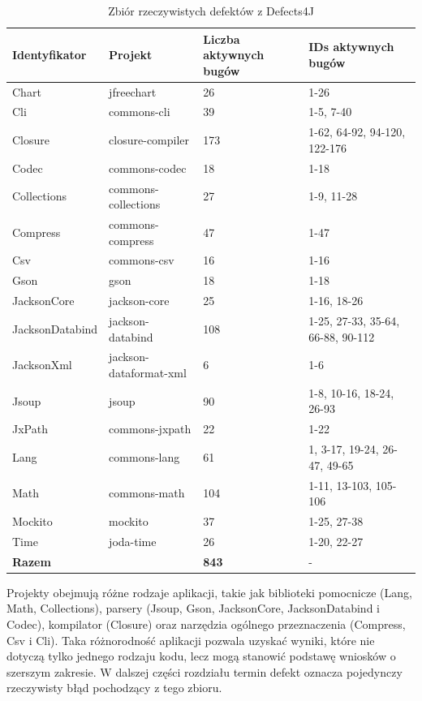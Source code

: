 \documentclass[12pt,a4paper,oldfontcommands]{memoir}
\theoremstyle{plain}
\theoremstyle{definition}
\theoremstyle{remark}
\begin{document}
    \begin{table}[H]
        \centering
        \small
        \begin{tabular}{|l|l|p{3.0cm}|l|}
            \hline
            Identyfikator & Projekt & Liczba aktywnych bugów & IDs aktywnych bugów \\ \hline
            Chart & jfreechart & 26 & 1-26 \\ \hline
            Cli & commons-cli & 39 & 1-5, 7-40 \\ \hline
            Closure & closure-compiler & 173 & 1-62, 64-92, 94-120, 122-176 \\ \hline
            Codec & commons-codec & 18 & 1-18 \\ \hline
            Collections & commons-collections & 27 & 1-9, 11-28 \\ \hline
            Compress & commons-compress & 47 & 1-47 \\ \hline
            Csv & commons-csv & 16 & 1-16 \\ \hline
            Gson & gson & 18 & 1-18 \\ \hline
            JacksonCore & jackson-core & 25 & 1-16, 18-26 \\ \hline
            JacksonDatabind & jackson-databind & 108 & 1-25, 27-33, 35-64, 66-88, 90-112 \\ \hline
            JacksonXml & jackson-dataformat-xml & 6 & 1-6 \\ \hline
            Jsoup & jsoup & 90 & 1-8, 10-16, 18-24, 26-93 \\ \hline
            JxPath & commons-jxpath & 22 & 1-22 \\ \hline
            Lang & commons-lang & 61 & 1, 3-17, 19-24, 26-47, 49-65 \\ \hline
            Math & commons-math & 104 & 1-11, 13-103, 105-106 \\ \hline
            Mockito & mockito & 37 & 1-25, 27-38 \\ \hline
            Time & joda-time & 26 & 1-20, 22-27 \\ \hline
            \textbf{Razem} & & \textbf{843} & - \\ \hline
        \end{tabular}
        \caption{Zbiór rzeczywistych defektów z Defects4J}
        \label{tab:defects4j}
    \end{table}

    Projekty obejmują różne rodzaje aplikacji, takie jak biblioteki pomocnicze (Lang, Math, Collections), parsery (Jsoup, Gson, JacksonCore, JacksonDatabind i Codec), kompilator (Closure) oraz narzędzia ogólnego przeznaczenia (Compress, Csv i Cli).
    Taka różnorodność aplikacji pozwala uzyskać wyniki, które nie dotyczą tylko jednego rodzaju kodu, lecz mogą stanowić podstawę wniosków o szerszym zakresie.
    W dalszej części rozdziału termin defekt oznacza pojedynczy rzeczywisty błąd pochodzący z tego zbioru.
\end{document}
